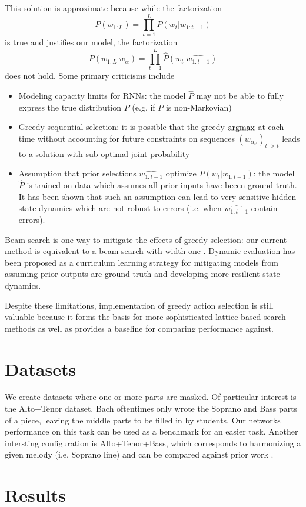 This solution is approximate because while the factorization
\begin{equation}
  P(w_{1:L}) = \prod_{t=1}^L P(w_t | w_{1:t-1})
\end{equation}
is true and justifies our model, the factorization
\begin{equation}
  P(w_{1:L} | w_{\alpha}) = \prod_{t=1}^L \hat{P}(w_t | \hat{w_{1:t-1}} )
\end{equation}
does not hold. Some primary criticisms include
\begin{itemize}
  \item Modeling capacity limits for RNNs: the model $\hat{P}$ may not be able to fully express
    the true distribution $P$ (e.g. if $P$ is non-Markovian)
  \item Greedy sequential selection: it is possible that the greedy $\operatorname*{argmax}$ at each
    time without accounting for future constraints on sequences $(w_{\alpha_{t'}})_{t' > t}$
    leads to a solution with sub-optimal joint probability
  \item Assumption that prior selections $\hat{w_{1:t-1}}$ optimize $P(w_t | w_{1:t-1})$:
    the model $\hat{P}$ is trained on data which assumes all prior inputs have beeen
    ground truth. It has been shown  that such an assumption can lead to
    very sensitive hidden state dynamics which are not robust to errors (i.e. when
    $\hat{w_{1:t-1}}$ contain errors).
\end{itemize}
Beam search is one way to mitigate the effects of greedy selection: our current method
is equivalent to a beam search with width one .
Dynamic evaluation  has been proposed as a curriculum learning strategy for
mitigating models from assuming prior outputs are ground truth and developing more resilient
state dynamics.

Despite these limitations, implementation of greedy action selection is still valuable
because it forms the basis for more sophisticated lattice-based search methods as well as
provides a baseline for comparing performance against.

\section{Datasets}

We create datasets where one or more parts are masked. Of particular interest is the
Alto+Tenor dataset. Bach oftentimes only wrote the Soprano and Bass parts of a piece,
leaving the middle parts to be filled in by students. Our networks performance on this task
can be used as a benchmark for an easier task. Another intersting configuration is Alto+Tenor+Bass,
which corresponds to harmonizing a given melody (i.e. Soprano line) and can be compared
against prior work .

\section{Results}


